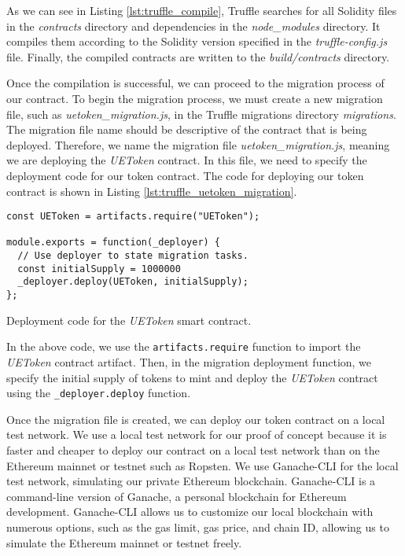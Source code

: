 As we can see in Listing \ref{lst:truffle_compile}, Truffle searches for all Solidity files in the \textit{contracts} directory and dependencies in the \textit{node\_modules} directory.
It compiles them according to the Solidity version specified in the \textit{truffle-config.js} file. Finally, the compiled contracts are written to the \textit{build/contracts} directory.


Once the compilation is successful, we can proceed to the migration process of our contract. To begin the migration process, we must create a new migration
file, such as \textit{uetoken\_migration.js}, in the Truffle migrations directory \textit{migrations}. The migration file name should be descriptive of the contract
that is being deployed. Therefore, we name the migration file \textit{uetoken\_migration.js}, meaning we are deploying the \textit{UEToken} contract. In this file,
we need to specify the deployment code for our token contract. The code for deploying our token contract is shown in Listing \ref{lst:truffle_uetoken_migration}.

\begin{listing}[H]
    \begin{verbatim}
const UEToken = artifacts.require("UEToken");

module.exports = function(_deployer) {
  // Use deployer to state migration tasks.
  const initialSupply = 1000000
  _deployer.deploy(UEToken, initialSupply);
};
    \end{verbatim}
    \caption{Deployment code for the \textit{UEToken} smart contract.}
    \label{lst:truffle_uetoken_migration}
\end{listing}

In the above code, we use the \texttt{artifacts.require} function to import the \textit{UEToken} contract artifact. Then, in the migration
deployment function, we specify the initial supply of tokens to mint and deploy the \textit{UEToken} contract using the \texttt{\_deployer.deploy} function.

Once the migration file is created, we can deploy our token contract on a local test network. We use a local test network for our proof of concept
because it is faster and cheaper to deploy our contract on a local test network than on the Ethereum mainnet or testnet such as Ropsten.
We use Ganache-CLI \cite{trufflesuite_ganachecli} for the local test network, simulating our private Ethereum blockchain. Ganache-CLI is a command-line version of Ganache, a personal blockchain
for Ethereum development. Ganache-CLI allows us to customize our local blockchain with numerous options, such as the gas limit, gas price, and chain ID, allowing
us to simulate the Ethereum mainnet or testnet freely.

